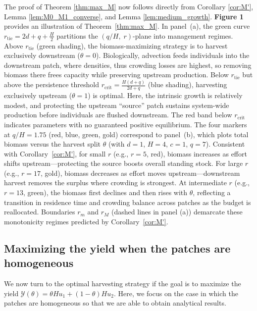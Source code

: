 \documentclass[11pt]{article}
\theoremstyle{definition}
\begin{document}
The proof of Theorem \ref{thm:max_M} now follows directly from Corollary  \ref{cor:M'}, Lemma \ref{lem:M0_M1_converse}, and Lemma \ref{lem:medium_growth}. \textbf{Figure 1} provides an illustration of Theorem~\ref{thm:max_M}. In panel~(a), the green curve \(r_{\mathrm{tie}}=2d+q+\tfrac{H}{2}\) partitions the \((q/H,\; r)\)-plane into management regimes. Above \(r_{\mathrm{tie}}\) (green shading), the biomass-maximizing strategy is to harvest exclusively downstream (\(\theta=0\)). Biologically, advection feeds individuals into the downstream patch, where densities, thus crowding losses are highest, so removing biomass there frees capacity while preserving upstream production. Below \(r_{\mathrm{tie}}\) but above the persistence threshold \(r_{\mathrm{crit}}=\tfrac{H(d+q)}{2d+q}\) (blue shading), harvesting exclusively upstream (\(\theta=1\)) is optimal. Here, the intrinsic growth is relatively modest, and protecting the upstream ``source'' patch sustains system-wide production before individuals are flushed downstream. The red band below \(r_{\mathrm{crit}}\) indicates parameters with no guaranteed positive equilibrium. The four markers at \(q/H=1.75\) (red, blue, green, gold) correspond to panel~(b), which plots total biomass versus the harvest split \(\theta\) (with \(d=1\), \(H=4\), \(c=1\), \(q=7\)). Consistent with Corollary~\ref{cor:M'}, for small \(r\) (e.g., \(r=5\), red), biomass increases as effort shifts upstream---protecting the source boosts overall standing stock. For large \(r\) (e.g., \(r=17\), gold), biomass decreases as effort moves upstream---downstream harvest removes the surplus where crowding is strongest. At intermediate \(r\) (e.g., \(r=13\), green), the biomass first declines and then rises with \(\theta\), reflecting a transition in residence time and crowding balance across patches as the budget is reallocated. Boundaries \(r_m\) and \(r_M\) (dashed lines in panel (a)) demarcate these monotonicity regimes predicted by Corollary~\ref{cor:M'}.


\subsection{Maximizing the yield when the patches are homogeneous}\label{sec:yield}

We now turn to the optimal harvesting strategy if the goal is to maximize the yield $\mathcal{Y}(\theta)=\theta Hu_1+(1-\theta)Hu_2$. Here, we focus on the case in which the patches are homogeneous so that we are able to obtain analytical results.
\end{document}
